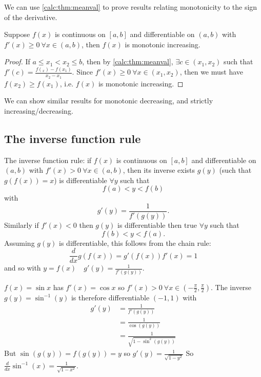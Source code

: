 \documentclass[10pt, a4paper]{article}
\begin{document}
We can use \autoref{calc:thm:meanval} to prove results relating monotonicity to the sign of the derivative.
    
\begin{example}
    Suppose $f(x)$ is continuous on $[a, b]$ and differentiable on $(a, b)$ with $f'(x) \geq 0\ \forall x \in (a, b)$, then $f(x)$ is monotonic increasing.
    \begin{proof}
        If $a \leq x_1 < x_2 \leq b$,
        then by \autoref{calc:thm:meanval},
        $\exists c \in (x_1, x_2)$ such that $f'(c) = \frac{f(_x) - f(x_1)}{x_2 - x_1}$.
        Since $f'(x) \geq 0\ \forall x \in (x_1, x_2)$,
        then we must have $f(x_2) \geq f(x_1)$, i.e. $f(x)$ is monotonic increasing.
    \end{proof}
\end{example}

We can show similar results for monotonic decreasing,
and strictly increasing/decreasing.

\subsection{The inverse function rule}
The inverse function rule: if $f(x)$ is continuous on $[a, b]$ and differentiable on $(a, b)$ with $f'(x) > 0\ \forall  x \in (a, b)$,
then its inverse exists $g(y)$
(such that $g(f(x)) = x$)
is differentiable $\forall y$ such that
\[
f(a) < y < f(b)
\]
with
\[
g'(y) = \frac{1}{f'(g(y))}.
\]
Similarly if $f'(x) < 0$ then $g(y)$ is differentiable then true $\forall y$ such that
\[
f(b) < y < f(a).
\]
Assuming $g(y)$ is differentiable, this follows from the chain rule:
\[
\frac{d}{dx}g(f(x)) = g'(f(x))f'(x) = 1
\]
and so with $y = f(x)\quad g'(y) = \frac{1}{f'(g(y))}$.

\begin{example}
    $f(x) = \sin x$ has $f'(x) = \cos x$ so $f'(x) > 0\ \forall x \in \left(-\frac{\pi}{2}, \frac{\pi}{2}\right)$.
    The inverse $g(y) = \sin ^ {-1}(y)$ is therefore differentiable $(-1, 1)$ with
    \begin{align*}
        g'(y) &= \frac{1}{f'(g(y))} \\
        &= \frac{1}{\cos(g(y))} \\
        &= \frac{1}{\sqrt{1 - \sin ^ 2 (g(y))}}
    \end{align*}
    But $\sin(g(y)) = f(g(y)) = y$ so
    $g'(y) = \frac{1}{\sqrt{1 - y ^ 2}}$
    So $\frac{d}{dx}\sin ^ {-1}(x) = \frac{1}{\sqrt{1 - x ^ 2}}$.
\end{example}
\end{document}
